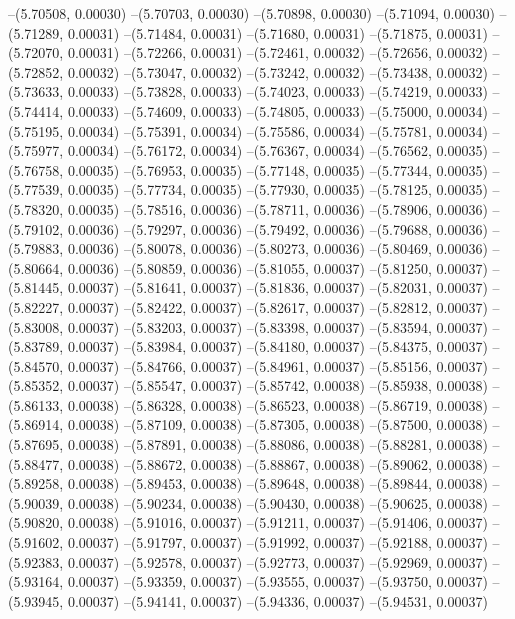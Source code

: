 --(5.70508, 0.00030)
--(5.70703, 0.00030)
--(5.70898, 0.00030)
--(5.71094, 0.00030)
--(5.71289, 0.00031)
--(5.71484, 0.00031)
--(5.71680, 0.00031)
--(5.71875, 0.00031)
--(5.72070, 0.00031)
--(5.72266, 0.00031)
--(5.72461, 0.00032)
--(5.72656, 0.00032)
--(5.72852, 0.00032)
--(5.73047, 0.00032)
--(5.73242, 0.00032)
--(5.73438, 0.00032)
--(5.73633, 0.00033)
--(5.73828, 0.00033)
--(5.74023, 0.00033)
--(5.74219, 0.00033)
--(5.74414, 0.00033)
--(5.74609, 0.00033)
--(5.74805, 0.00033)
--(5.75000, 0.00034)
--(5.75195, 0.00034)
--(5.75391, 0.00034)
--(5.75586, 0.00034)
--(5.75781, 0.00034)
--(5.75977, 0.00034)
--(5.76172, 0.00034)
--(5.76367, 0.00034)
--(5.76562, 0.00035)
--(5.76758, 0.00035)
--(5.76953, 0.00035)
--(5.77148, 0.00035)
--(5.77344, 0.00035)
--(5.77539, 0.00035)
--(5.77734, 0.00035)
--(5.77930, 0.00035)
--(5.78125, 0.00035)
--(5.78320, 0.00035)
--(5.78516, 0.00036)
--(5.78711, 0.00036)
--(5.78906, 0.00036)
--(5.79102, 0.00036)
--(5.79297, 0.00036)
--(5.79492, 0.00036)
--(5.79688, 0.00036)
--(5.79883, 0.00036)
--(5.80078, 0.00036)
--(5.80273, 0.00036)
--(5.80469, 0.00036)
--(5.80664, 0.00036)
--(5.80859, 0.00036)
--(5.81055, 0.00037)
--(5.81250, 0.00037)
--(5.81445, 0.00037)
--(5.81641, 0.00037)
--(5.81836, 0.00037)
--(5.82031, 0.00037)
--(5.82227, 0.00037)
--(5.82422, 0.00037)
--(5.82617, 0.00037)
--(5.82812, 0.00037)
--(5.83008, 0.00037)
--(5.83203, 0.00037)
--(5.83398, 0.00037)
--(5.83594, 0.00037)
--(5.83789, 0.00037)
--(5.83984, 0.00037)
--(5.84180, 0.00037)
--(5.84375, 0.00037)
--(5.84570, 0.00037)
--(5.84766, 0.00037)
--(5.84961, 0.00037)
--(5.85156, 0.00037)
--(5.85352, 0.00037)
--(5.85547, 0.00037)
--(5.85742, 0.00038)
--(5.85938, 0.00038)
--(5.86133, 0.00038)
--(5.86328, 0.00038)
--(5.86523, 0.00038)
--(5.86719, 0.00038)
--(5.86914, 0.00038)
--(5.87109, 0.00038)
--(5.87305, 0.00038)
--(5.87500, 0.00038)
--(5.87695, 0.00038)
--(5.87891, 0.00038)
--(5.88086, 0.00038)
--(5.88281, 0.00038)
--(5.88477, 0.00038)
--(5.88672, 0.00038)
--(5.88867, 0.00038)
--(5.89062, 0.00038)
--(5.89258, 0.00038)
--(5.89453, 0.00038)
--(5.89648, 0.00038)
--(5.89844, 0.00038)
--(5.90039, 0.00038)
--(5.90234, 0.00038)
--(5.90430, 0.00038)
--(5.90625, 0.00038)
--(5.90820, 0.00038)
--(5.91016, 0.00037)
--(5.91211, 0.00037)
--(5.91406, 0.00037)
--(5.91602, 0.00037)
--(5.91797, 0.00037)
--(5.91992, 0.00037)
--(5.92188, 0.00037)
--(5.92383, 0.00037)
--(5.92578, 0.00037)
--(5.92773, 0.00037)
--(5.92969, 0.00037)
--(5.93164, 0.00037)
--(5.93359, 0.00037)
--(5.93555, 0.00037)
--(5.93750, 0.00037)
--(5.93945, 0.00037)
--(5.94141, 0.00037)
--(5.94336, 0.00037)
--(5.94531, 0.00037)
